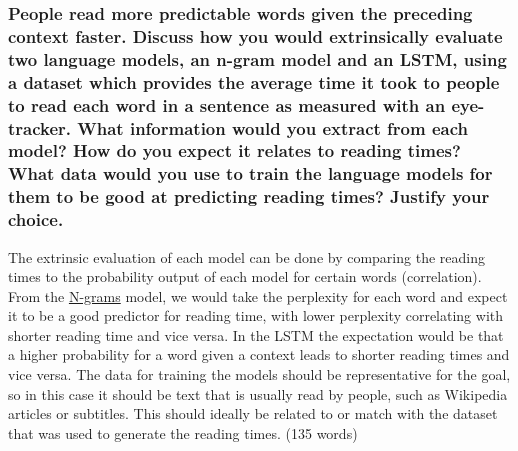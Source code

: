\documentclass[
  11pt,
  british,
]{article}
\begin{document}
\hypertarget{people-read-more-predictable-words-given-the-preceding-context-faster.-discuss-how-you-would-extrinsically-evaluate-two-language-models-an-n-gram-model-and-an-lstm-using-a-dataset-which-provides-the-average-time-it-took-to-people-to-read-each-word-in-a-sentence-as-measured-with-an-eye-tracker.-what-information-would-you-extract-from-each-model-how-do-you-expect-it-relates-to-reading-times-what-data-would-you-use-to-train-the-language-models-for-them-to-be-good-at-predicting-reading-times-justify-your-choice.}{%
\subsubsection{People read more predictable words given the preceding
context faster. Discuss how you would extrinsically evaluate two
language models, an n-gram model and an LSTM, using a dataset which
provides the average time it took to people to read each word in a
sentence as measured with an eye-tracker. What information would you
extract from each model? How do you expect it relates to reading times?
What data would you use to train the language models for them to be good
at predicting reading times? Justify your
choice.}\label{people-read-more-predictable-words-given-the-preceding-context-faster.-discuss-how-you-would-extrinsically-evaluate-two-language-models-an-n-gram-model-and-an-lstm-using-a-dataset-which-provides-the-average-time-it-took-to-people-to-read-each-word-in-a-sentence-as-measured-with-an-eye-tracker.-what-information-would-you-extract-from-each-model-how-do-you-expect-it-relates-to-reading-times-what-data-would-you-use-to-train-the-language-models-for-them-to-be-good-at-predicting-reading-times-justify-your-choice.}}

The extrinsic evaluation of each model can be done by comparing the
reading times to the probability output of each model for certain words
(correlation). From the \href{../Languages/N-grams.md}{N-grams} model,
we would take the perplexity for each word and expect it to be a good
predictor for reading time, with lower perplexity correlating with
shorter reading time and vice versa. In the LSTM the expectation would
be that a higher probability for a word given a context leads to shorter
reading times and vice versa. The data for training the models should be
representative for the goal, so in this case it should be text that is
usually read by people, such as Wikipedia articles or subtitles. This
should ideally be related to or match with the dataset that was used to
generate the reading times. (135 words)
\end{document}

